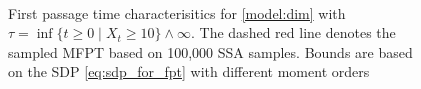 \begin{figure}
    \myfloatalign
     \quad
     \\
    \caption[FPT and MFPT distribution and bounds]{First passage time characterisitics for \autoref{model:dim} with $\tau=\inf\{t\geq 0\mid X_t \geq 10\}\land \infty$.
	The dashed red line denotes the sampled MFPT based on 100,000 SSA samples. Bounds are based on the SDP \eqref{eq:sdp_for_fpt} with different moment orders}
\end{figure}


